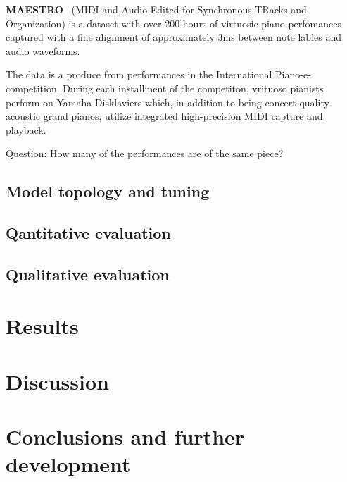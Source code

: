 \documentclass{article}
\begin{document}
    \textbf{MAESTRO}~\cite{maestrodataset}
    (MIDI and Audio Edited for Synchronous TRacks and Organization)
    is a dataset with over 200 hours of virtuosic piano perfomances captured with 
    a fine alignment of approximately 3ms between note lables and audio waveforms.

    The data is a produce from performances in the International Piano-e-competition.
    During each installment of the competiton, vrituoso pianists perform on Yamaha
    Disklaviers which, in addition to being concert-quality acoustic grand pianos,
    utilize integrated high-precision MIDI capture and playback.

    Question: How many of the performances are of the same piece?
    
    \subsection{Model topology and tuning}
    
    \subsection{Qantitative evaluation}
    
    \subsection{Qualitative evaluation}
    
    \section{Results}
    
    \section{Discussion}
    
    \section{Conclusions and further development}

    \printbibliography
\end{document}
